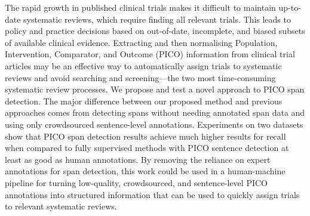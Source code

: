 The rapid growth in published clinical trials makes it difficult to maintain up-to-date systematic reviews, which require finding all relevant trials. This leads to policy and practice decisions based on out-of-date, incomplete, and biased subsets of available clinical evidence. Extracting and then normalising Population, Intervention, Comparator, and Outcome (PICO) information from clinical trial articles may be an effective way to automatically assign trials to systematic reviews and avoid searching and screening—the two most time-consuming systematic review processes. We propose and test a novel approach to PICO span detection. The major difference between our proposed method and previous approaches comes from detecting spans without needing annotated span data and using only crowdsourced sentence-level annotations. Experiments on two datasets show that PICO span detection results achieve much higher results for recall when compared to fully supervised methods with PICO sentence detection at least as good as human annotations. By removing the reliance on expert annotations for span detection, this work could be used in a human-machine pipeline for turning low-quality, crowdsourced, and sentence-level PICO annotations into structured information that can be used to quickly assign trials to relevant systematic reviews.
